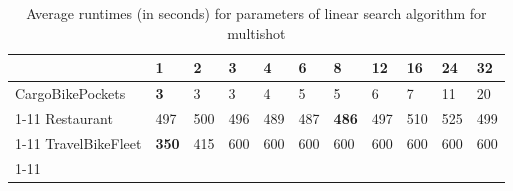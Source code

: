 \begin{table}[ht]
\centering
\caption{Average runtimes (in seconds) for  parameters of linear search algorithm for multishot}
\label{tab:results:linear}
\begin{tabular}{l|llllllllll}
\toprule
 & 1 & 2 & 3 & 4 & 6 & 8 & 12 & 16 & 24 & 32 \\
\midrule
CargoBikePockets & \textbf{3} & 3 & 3 & 4 & 5 & 5 & 6 & 7 & 11 & 20 \\
\cline{1-11}
Restaurant & 497 & 500 & 496 & 489 & 487 & \textbf{486} & 497 & 510 & 525 & 499 \\
\cline{1-11}
TravelBikeFleet & \textbf{350} & 415 & 600 & 600 & 600 & 600 & 600 & 600 & 600 & 600 \\
\cline{1-11}
\bottomrule
\end{tabular}
\end{table}
